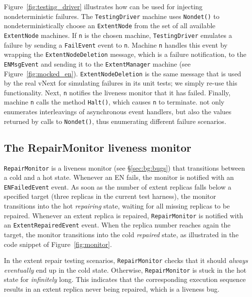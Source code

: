 Figure~\ref{fig:testing_driver} illustrates how \psharp can be used for injecting nondeterministic failures. The \texttt{TestingDriver} machine uses \texttt{Nondet()} to nondeterministically choose an \texttt{ExtentNode} from the set of all available \texttt{ExtentNode} machines. If \texttt{n} is the chosen machine, \texttt{TestingDriver} emulates a failure by sending a \texttt{FailEvent} event to \texttt{n}. Machine \texttt{n} handles this event by wrapping the \texttt{ExtentNodeDeletion} message, which is a failure notification, to the \texttt{ENMsgEvent} and sending it to the \texttt{ExtentManager} machine (see Figure~\ref{fig:mocked_en}). \texttt{ExtentNodeDeletion} is the same message that is used by the real vNext for simulating failures in its unit tests; we simply re-use this functionality. Next, \texttt{n} notifies the liveness monitor that it has failed. Finally, machine \texttt{n} calls the \psharp method \texttt{Halt()}, which causes \texttt{n} to terminate. \psharp not only enumerates interleavings of asynchronous event handlers, but also the values returned by calls to \texttt{Nondet()}, thus enumerating different failure scenarios.

\subsection{The RepairMonitor liveness monitor}
\label{sec:method:monitor}

\texttt{RepairMonitor} is a \psharp liveness monitor (see \S\ref{sec:bg:bugs}) that transitions between a cold and a hot state. Whenever an EN fails, the monitor is notified with an \texttt{ENFailedEvent} event. As soon as the number of extent replicas falls below a specified target (three replicas in the current \psharp test harness), the monitor transitions into the hot \emph{repairing} state, waiting for all missing replicas to be repaired. Whenever an extent replica is repaired, \texttt{RepairMonitor} is notified with an \texttt{ExtentRepairedEvent} event. When the replica number reaches again the target, the monitor transitions into the cold \emph{repaired} state, as illustrated in the code snippet of Figure~\ref{fig:monitor}.

In the extent repair testing scenarios, \texttt{RepairMonitor} checks that it should \emph{always eventually} end up in the cold state. Otherwise, \texttt{RepairMonitor} is stuck in the hot state for \emph{infinitely} long. This indicates that the corresponding execution sequence results in an extent replica never being repaired, which is a liveness bug.

